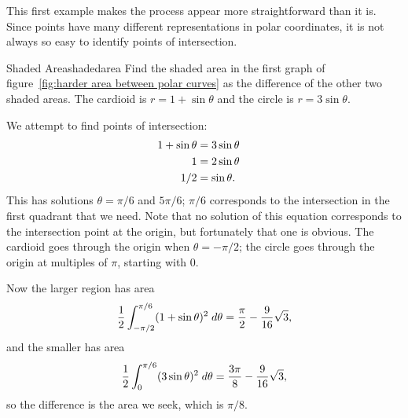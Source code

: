 This first example makes the process appear more straightforward than it
is. Since points have many different representations in polar
coordinates, it is not always so easy to identify points of
intersection. 

\begin{example}{Shaded Area}{shadedarea}
Find the shaded area in the first graph of
figure~\ref{fig:harder area between polar curves} as the difference
of the other two shaded areas. The cardioid is $r=1+\sin\theta$ and
the circle is $r=3\sin\theta$. 
\end{example}

\begin{solution}
We attempt to find points of intersection:
\begin{eqnarray*}
  1+\sin\theta&=3\sin\theta\cr
  1&=2\sin\theta\cr
  1/2&=\sin\theta.\cr
\end{eqnarray*}
This has solutions $\theta=\pi/6$ and $5\pi/6$; $\pi/6$ corresponds to
the intersection in the first quadrant that we need.  Note that no
solution of this equation corresponds to the intersection point at the
origin, but fortunately that one is obvious. The cardioid goes through
the origin when $\theta=-\pi/2$; the circle goes through the origin at
multiples of $\pi$, starting with $0$.

Now the larger region has area
$$
  {1\over2}\int_{-\pi/2}^{\pi/6} (1+\sin\theta)^2\;d\theta=
  {\pi\over2}-{9\over16}\sqrt{3},
$$
and the smaller has area
$$
  {1\over2}\int_{0}^{\pi/6} (3\sin\theta)^2\;d\theta=
  {3\pi\over8} - {9\over16}\sqrt{3},
$$
so the difference is the area we seek, which is $\pi/8$.
\end{solution}



